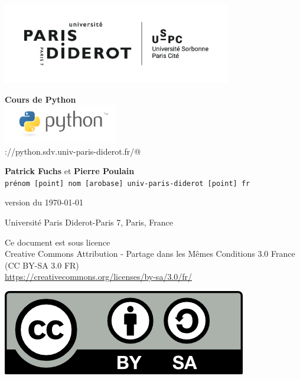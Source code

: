 \documentclass[10pt]{book}
\begin{document}
\thispagestyle{empty}

\begin{titlepage}

\begin{center}

\includegraphics[width=10cm]{img/LogoUPD_USPC.png}

\vspace{3cm}

{\Huge \bf Cours de Python}\\
\includegraphics[width=5cm]{img/logo_python.png} \\
\verb@https://python.sdv.univ-paris-diderot.fr/@
\vspace{2cm}

{\large
	{\bf Patrick Fuchs} et {\bf Pierre Poulain} \\
	{\tt prénom [point] nom [arobase] univ-paris-diderot [point] fr}
}

\vspace{3 cm}

version du \today

\vspace{3cm}
Université Paris Diderot-Paris 7, Paris, France

\vfill

\begin{minipage}{0.80\textwidth}
\footnotesize
Ce document est sous licence \\
Creative Commons Attribution - Partage dans les Mêmes Conditions 3.0 France \\
(CC BY-SA 3.0 FR) \\
\url{https://creativecommons.org/licenses/by-sa/3.0/fr/}
\end{minipage}
\begin{minipage}{0.15\textwidth}
\includegraphics{img/logo_CC-BY-SA.png}
\end{minipage}

\end{center}
\end{titlepage}
\end{document}
